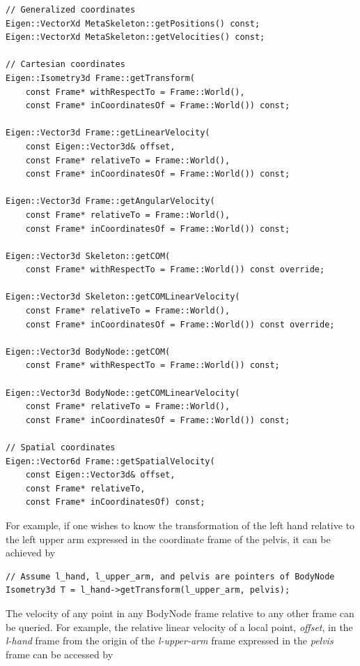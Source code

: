 \begin{lstlisting}
// Generalized coordinates
Eigen::VectorXd MetaSkeleton::getPositions() const;
Eigen::VectorXd MetaSkeleton::getVelocities() const;

// Cartesian coordinates
Eigen::Isometry3d Frame::getTransform(
    const Frame* withRespectTo = Frame::World(), 
    const Frame* inCoordinatesOf = Frame::World()) const;
    
Eigen::Vector3d Frame::getLinearVelocity(
    const Eigen::Vector3d& offset, 
    const Frame* relativeTo = Frame::World(), 
    const Frame* inCoordinatesOf = Frame::World()) const;
    
Eigen::Vector3d Frame::getAngularVelocity(
    const Frame* relativeTo = Frame::World(), 
    const Frame* inCoordinatesOf = Frame::World()) const;
    
Eigen::Vector3d Skeleton::getCOM(
    const Frame* withRespectTo = Frame::World()) const override;
    
Eigen::Vector3d Skeleton::getCOMLinearVelocity(
    const Frame* relativeTo = Frame::World(), 
    const Frame* inCoordinatesOf = Frame::World()) const override;
    
Eigen::Vector3d BodyNode::getCOM(
    const Frame* withRespectTo = Frame::World()) const;
    
Eigen::Vector3d BodyNode::getCOMLinearVelocity(
    const Frame* relativeTo = Frame::World(), 
    const Frame* inCoordinatesOf = Frame::World()) const;

// Spatial coordinates
Eigen::Vector6d Frame::getSpatialVelocity(
    const Eigen::Vector3d& offset, 
    const Frame* relativeTo, 
    const Frame* inCoordinatesOf) const;
\end{lstlisting}

For  example, if one wishes to know the transformation of the left
hand relative to the left upper arm expressed in the coordinate frame of the
pelvis, it can be achieved by 

\begin{lstlisting}
// Assume l_hand, l_upper_arm, and pelvis are pointers of BodyNode
Isometry3d T = l_hand->getTransform(l_upper_arm, pelvis);
\end{lstlisting}

The velocity of any point in any BodyNode frame relative to any other
frame can be queried. For example, the relative linear velocity of a
local point, \emph{offset}, in the \emph{l-hand} frame from the origin of the \emph{l-upper-arm} frame expressed in the \emph{pelvis} frame can be accessed by

